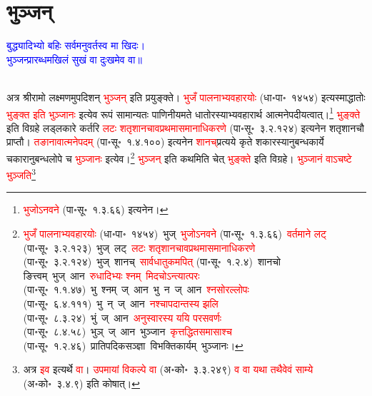 \section[भुञ्जन्]{भुञ्जन्}
\centering\textcolor{blue}{बुद्ध्यादिभ्यो बहिः सर्वमनुवर्तस्व मा खिदः।\nopagebreak\\
भुञ्जन्प्रारब्धमखिलं सुखं वा दुःखमेव वा॥}\nopagebreak\\
\\
\begin{sloppypar}\justifying\noindent\hspace{10mm} अत्र श्रीरामो लक्ष्मणमुपदिशन् \textcolor{red}{भुञ्जन्} इति प्रयुङ्क्ते। \textcolor{red}{भुजँ पालनाभ्यवहारयोः} (धा॰पा॰~१४५४) इत्यस्माद्धातोः \textcolor{red}{भुङ्क्त इति भुञ्जानः} इत्येव रूपं सामान्यतः पाणिनीय\-मते धातोरस्याभ्यवहारार्थ
आत्मनेपदीयत्वात्।\footnote{\textcolor{red}{भुजोऽनवने} (पा॰सू॰~१.३.६६) इत्यनेन।} \textcolor{red}{भुङ्क्ते} इति विग्रहे लड्लकारे कर्तरि \textcolor{red}{लटः शतृ\-शानचावप्रथमा\-समानाधिकरणे} (पा॰सू॰~३.२.१२४) इत्यनेन शतृ\-शानचौ प्राप्तौ। \textcolor{red}{तङानावात्मनेपदम्} (पा॰सू॰~१.४.१००) इत्यनेन \textcolor{red}{शानच्‌}\-प्रत्यये कृते शकारस्यानुबन्ध\-कार्ये चकारानुबन्ध\-लोपे च \textcolor{red}{भुञ्जानः} इत्येव।\footnote{\textcolor{red}{भुजँ पालनाभ्यवहारयोः} (धा॰पा॰~१४५४)~\arrow भुज्~\arrow \textcolor{red}{भुजोऽनवने} (पा॰सू॰~१.३.६६)~\arrow \textcolor{red}{वर्तमाने लट्} (पा॰सू॰~३.२.१२३)~\arrow भुज्~लट्~\arrow \textcolor{red}{लटः शतृ\-शानचावप्रथमा\-समानाधिकरणे} (पा॰सू॰~३.२.१२४)~\arrow भुज्~शानच्~\arrow \textcolor{red}{सार्वधातुकमपित्} (पा॰सू॰~१.२.४)~\arrow शानचो ङित्त्वम्~\arrow भुज्~आन~\arrow \textcolor{red}{रुधादिभ्यः श्नम्}~\arrow \textcolor{red}{मिदचोऽन्त्यात्परः} (पा॰सू॰~१.१.४७)~\arrow भु~श्नम्~ज्~आन~\arrow भु~न~ज्~आन~\arrow \textcolor{red}{श्नसोरल्लोपः} (पा॰सू॰~६.४.१११)~\arrow भु~न्~ज्~आन~\arrow \textcolor{red}{नश्चापदान्तस्य झलि} (पा॰सू॰~८.३.२४)~\arrow भुं~ज्~आन~\arrow \textcolor{red}{अनुस्वारस्य ययि परसवर्णः} (पा॰सू॰~८.४.५८)~\arrow भुञ्~ज्~आन~\arrow भुञ्जान~\arrow \textcolor{red}{कृत्तद्धित\-समासाश्च} (पा॰सू॰~१.२.४६)~\arrow प्रातिपदिक\-सञ्ज्ञा~\arrow विभक्ति\-कार्यम्~\arrow भुञ्जानः।} \textcolor{red}{भुञ्जन्} इति कथमिति चेत् \textcolor{red}{भुङ्क्ते} इति विग्रहे। \textcolor{red}{भुञ्जानं वाऽचष्टे भुञ्जति}\footnote{अत्र \textcolor{red}{इव} इत्यर्थे \textcolor{red}{वा}। \textcolor{red}{उपमायां विकल्पे वा} (अ॰को॰~३.३.२४९) \textcolor{red}{व वा यथा तथैवेवं साम्ये} (अ॰को॰~३.४.९) इति कोषात्।
}
\end{sloppypar}
